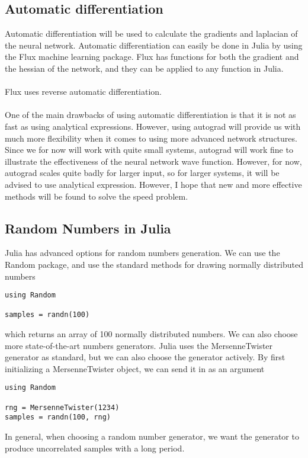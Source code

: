 \subsection{Automatic differentiation}
Automatic differentiation will be used to calculate the gradients and laplacian of the neural network. Automatic differentiation can easily be done in Julia by using the Flux machine learning package. Flux has functions for both the gradient and the hessian of the network, and they can be applied to any function in Julia.
\\
\\
Flux uses reverse automatic differentiation.
\\
\\
One of the main drawbacks of using automatic differentiation is that it is not as fast as using analytical expressions. However, using autograd will provide us with much more flexibility when it comes to using more advanced network structures. Since we for now will work with quite small systems, autograd will work fine to illustrate the effectiveness of the neural network wave function. However, for now, autograd scales quite badly for larger input, so for larger systems, it will be advised to use analytical expression. However, I hope that new and more effective methods will be found to solve the speed problem.

\subsection{Random Numbers in Julia}
Julia has advanced options for random numbers generation. We can use the Random package, and use the standard methods for drawing normally distributed numbers
\begin{lstlisting}
using Random

samples = randn(100)
\end{lstlisting}
which returns an array of 100 normally distributed numbers. We can also choose more state-of-the-art numbers generators. Julia uses the MersenneTwister generator as standard, but we can also choose the generator actively. By first initializing a MersenneTwister object, we can send it in as an argument 
\begin{lstlisting}
using Random

rng = MersenneTwister(1234)
samples = randn(100, rng)
\end{lstlisting}

In general, when choosing a random number generator, we want the generator to produce uncorrelated samples with a long period. 

